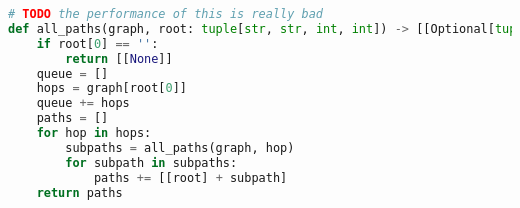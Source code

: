 \begin{lstlisting}[float, language={Python},caption={DFS-based algorithm which generates a list of all possible paths between between two nodes in a DAG},label={alg:all-paths}]
# TODO the performance of this is really bad
def all_paths(graph, root: tuple[str, str, int, int]) -> [[Optional[tuple[str, str, int, int]]]]:
    if root[0] == '':
        return [[None]]
    queue = []
    hops = graph[root[0]]
    queue += hops
    paths = []
    for hop in hops:
        subpaths = all_paths(graph, hop)
        for subpath in subpaths:
            paths += [[root] + subpath]
    return paths
\end{lstlisting}
